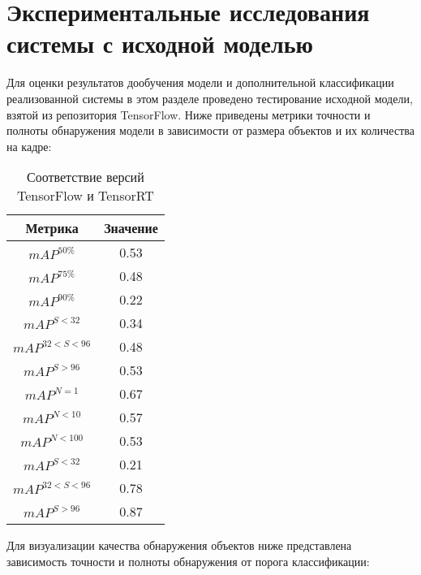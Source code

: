 \section{Экспериментальные исследования системы с исходной моделью}

Для оценки результатов дообучения модели и дополнительной классификации реализованной системы в этом разделе проведено тестирование исходной модели, взятой из репозитория TensorFlow. Ниже приведены метрики точности и полноты обнаружения модели в зависимости от размера объектов и их количества на кадре:

\begin{table}[H]
	\def\arraystretch{1.3}
	\caption{Соответствие версий TensorFlow и TensorRT}
	\begin{center}
		\begin{tabular}{|c|c|}
			\hline
			Метрика & Значение\\  \hline			
			\(mAP^{50\%}\) & 0.53\\ \hline			
			\(mAP^{75\%}\) & 0.48\\ \hline
			\(mAP^{90\%}\) & 0.22\\ \hline
			\(mAP^{S<32}\) & 0.34\\ \hline
			\(mAP^{32<S<96}\) & 0.48\\ \hline
			\(mAP^{S>96}\) & 0.53\\ \hline
			\(mAP^{N=1}\) & 0.67\\ \hline
			\(mAP^{N<10}\) & 0.57\\ \hline
			\(mAP^{N<100}\) & 0.53\\ \hline
			\(mAP^{S<32}\) & 0.21\\ \hline
			\(mAP^{32<S<96}\) & 0.78\\ \hline
			\(mAP^{S>96}\) & 0.87\\ \hline			
		\end{tabular}
		\label{tabular:tab_examp}
	\end{center}
\end{table}

Для визуализации качества обнаружения объектов ниже представлена зависимость точности и полноты обнаружения от порога классификации:





























